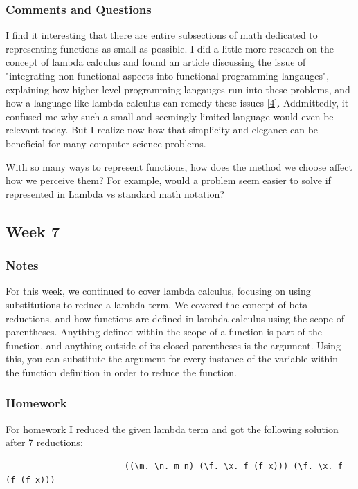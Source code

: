 \documentclass{article}
\theoremstyle{theorem}
\theoremstyle{definition}
\theoremstyle{remark}
\begin{document}
\subsubsection{Comments and Questions}
I find it interesting that there are entire subsections of math dedicated to representing functions as small as possible. I did a little more research on the concept of lambda calculus and found an article discussing the issue of 
"integrating non-functional aspects into functional programming langauges", explaining how higher-level programming langauges run into these problems, and how a language like lambda calculus can remedy these issues \hyperref[4]{[4]}.
 Addmittedly, it confused me why such a small and seemingly limited language would even be relevant today. But I realize now how that simplicity and elegance can be beneficial for many computer science problems.

\hspace{0.65cm}With so many ways to represent functions, how does the method we choose affect how we perceive them? For example, would a problem seem easier to solve if represented in Lambda vs standard math notation?


\subsection{Week 7}

\subsubsection{Notes}
For this week, we continued to cover lambda calculus, focusing on using substitutions to reduce a lambda term. We covered the concept of beta reductions, and how functions are defined in lambda calculus
using the scope of parentheses. Anything defined within the scope of a function is part of the function, and anything outside of its closed parentheses is the argument. Using this, you can substitute the argument for 
every instance of the variable within the function definition in order to reduce the function. 

\subsubsection{Homework}
For homework I reduced the given lambda term and got the following solution after 7 reductions: 

\begin{verbatim}
                        ((\m. \n. m n) (\f. \x. f (f x))) (\f. \x. f (f (f x))) 
\end{verbatim}
\end{document}
